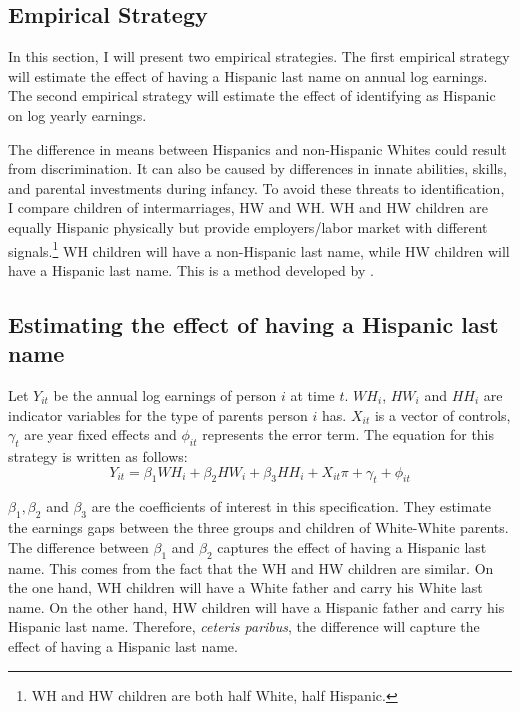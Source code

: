 \documentclass[12pt, fullpage]{article}
\begin{document}
\subsection{Empirical Strategy}\label{sec:emp_model}
In this section, I will present two empirical strategies. The first empirical strategy will estimate the effect of having a Hispanic last name on annual log earnings. The second empirical strategy will estimate the effect of identifying as Hispanic on log yearly earnings.

The difference in means between Hispanics and non-Hispanic Whites could result from discrimination. It can also be caused by differences in innate abilities, skills, and parental investments during infancy. To avoid these threats to identification, I compare children of intermarriages, HW and WH. WH and HW children are equally Hispanic physically but provide employers/labor market with different signals.\footnote{WH and HW children are both half White, half Hispanic.} WH children will have a non-Hispanic last name, while HW children will have a Hispanic last name. This is a method developed by \citet{rubinstein2014pride}.

\subsection{Estimating the effect of having a Hispanic last name}

Let $Y_{it}$ be the annual log earnings of person $i$ at time $t$. $WH_{i}$, $HW_{i}$ and $HH_{i}$ are indicator variables for the type of parents person $i$ has. $X_{it}$ is a vector of controls, $\gamma_{t}$ are year fixed effects and $\phi_{it}$ represents the error term. The equation for this strategy is written as follows:
\begin{equation} \label{eq:1a}
Y_{it} = \beta_{1} WH_{i} +\beta_{2} HW_{i} + \beta_{3} HH_{i} + X_{it} \pi + \gamma_{t}+\phi_{it}
\end{equation}

$\beta_{1}, \beta_{2}$ and $\beta_{3}$ are the coefficients of interest in this specification. They estimate the earnings gaps between the three groups and children of White-White parents. The difference between $\beta_{1}$ and $\beta_{2}$ captures the effect of having a Hispanic last name. This comes from the fact that the WH and HW children are similar. On the one hand, WH children will have a White father and carry his White last name. On the other hand, HW children will have a Hispanic father and carry his Hispanic last name. Therefore, \textit{ceteris paribus}, the difference will capture the effect of having a Hispanic last name.
\end{document}
